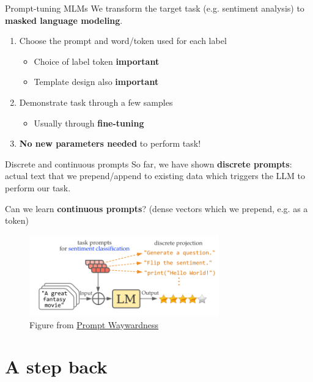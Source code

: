 \documentclass[12pt,aspectratio=169,handout]{beamer}
\begin{document}
\begin{frame}{Prompt-tuning MLMs}
	We transform the target task (e.g. sentiment analysis) to \textbf{masked language modeling}.
	\begin{enumerate}
		\item Choose the prompt and word/token used for each label 
		\pause
		\begin{itemize}
			\item Choice of label token \textbf{important}
			\item Template design also \textbf{important}
		\end{itemize}
		\pause
		\item Demonstrate task through a few samples
		\pause
		\begin{itemize}
			\item Usually through \textbf{fine-tuning}
		\end{itemize}
		\pause
		\item \textbf{No new parameters needed} to perform task!
	\end{enumerate}
\end{frame}


\begin{frame}{Discrete and continuous prompts}
	So far, we have shown \textbf{discrete prompts}: actual text that we prepend/append to existing data which triggers the LLM to perform our task.
	\pause
	\vspace{1em}
	
	Can we learn \textbf{continuous prompts}? 
	\pause
	(dense vectors which we prepend, e.g. as a token)
	\pause
	\begin{figure}[h]
		\includegraphics[height=3.5cm]{continuous-prompts}
		\caption*{Figure from \href{https://aclanthology.org/2022.naacl-main.266.pdf}{\underline{Prompt Waywardness}}}
	\end{figure}
\end{frame}


\section{A step back}
\end{document}
